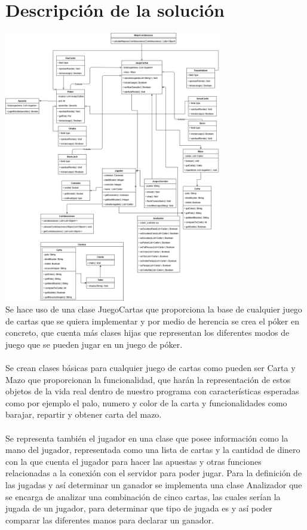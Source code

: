 \documentclass{article}
\begin{document}
\section{Descripción de la solución}
\includegraphics[width=9.5cm]{img/Diagrama de Clases.png}\\[1cm]
Se hace uso de una clase JuegoCartas que proporciona la base de cualquier juego de cartas que se quiera implementar y por medio de herencia se crea el póker en concreto, que cuenta más clases hijas que representan los diferentes modos de juego que se pueden jugar en un juego de póker.
\\\\
Se crean clases básicas para cualquier juego de cartas como pueden ser Carta y Mazo que proporcionan la funcionalidad, que harán la representación de estos objetos de la vida real dentro de nuestro programa con características esperadas como por ejemplo el palo, numero y color de la carta y funcionalidades como barajar, repartir y obtener carta del mazo.
\\\\
Se representa también el jugador en una clase que posee información como la mano del jugador, representada como una lista de cartas y la cantidad de dinero con la que cuenta el jugador para hacer las apuestas y otras funciones relacionadas a la conexión con el servidor para poder jugar. Para la definición de las jugadas y así determinar un ganador se implementa una clase Analizador que se encarga de analizar una combinación de cinco cartas, las cuales serían la jugada de un jugador, para determinar que tipo de jugada es y así poder comparar las diferentes manos para declarar un ganador.
\end{document}
